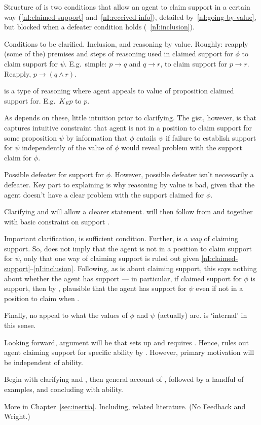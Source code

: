 \begin{note}
  Structure of \nI{} is two conditions that allow an agent to claim support in a certain way (\ref{nI:claimed-support} and~\ref{nI:received-info}), detailed by~\ref{nI:going-by-value}, but blocked when a defeater condition holds (~\ref{nI:inclusion}).

  Conditions to be clarified.
  Inclusion, and reasoning by value.
  Roughly:
  \incl{} reapply (some of the) premises and steps of reasoning used in claimed support for \(\phi\) to claim support for \(\psi\).
  E.g.\ simple: \(p \rightarrow q\) and \(q \rightarrow r\), to claim support for \(p \rightarrow r\).
  Reapply, \(p \rightarrow (q \land r)\).

  \RBV{} is a type of reasoning where agent appeals to value of proposition claimed support for.
  E.g.\ \(K_{E}p\) to \(p\).

  As \nI{} depends on these, little intuition prior to clarifying.
  The gist, however, is that \nI{} captures intuitive constraint that agent is not in a position to claim support for some proposition \(\psi\) by information that \(\phi\) entails \(\psi\) if failure to establish support for \(\psi\) independently of the value of \(\phi\) would reveal problem with the support claim for \(\phi\).

  Possible defeater for support for \(\phi\).
  However, possible defeater isn't necessarily a defeater.
  Key part to explaining \nI{} is why reasoning by value is bad, given that the agent doesn't have a clear problem with the support claimed for \(\phi\).

  Clarifying \incl{} and \RBV{} will allow a clearer statement.
  \nI{} will then follow from \incl{} and \RBV{} together with basic constraint on support \eiS{}.

  Important clarification, \nI{} is sufficient condition.
  Further, \RBV{} is \emph{a way} of claiming support.
  So, \nI{} does not imply that the agent is not in a position to claim support for \(\psi\), only that one way of claiming support is ruled out given \ref{nI:claimed-support}--\ref{nI:inclusion}.
  Following, as \nI{} is about claiming support, this says nothing about whether the agent has support --- in particular, if claimed support for \(\phi\) is support, then by \incl{}, plausible that the agent has support for \(\psi\) even if not in a position to claim when \RBV{}.

  Finally, no appeal to what the values of \(\phi\) and \(\psi\) (actually) are.
  \nI{} is `internal' in this sense.

  Looking forward, argument will be that \gsi{} sets up \incl{} and \AR{} requires \RBV{}.
  Hence, \nI{} rules out agent claiming support for specific ability by \AR{}.
  However, primary motivation will be independent of ability.

  Begin with clarifying \incl{} and \RBV{}, then general account of \nI{}, followed by a handful of examples, and concluding with ability.

  More in Chapter~\ref{sec:inertia}.
  Including, related literature. (No Feedback and Wright.)
\end{note}

